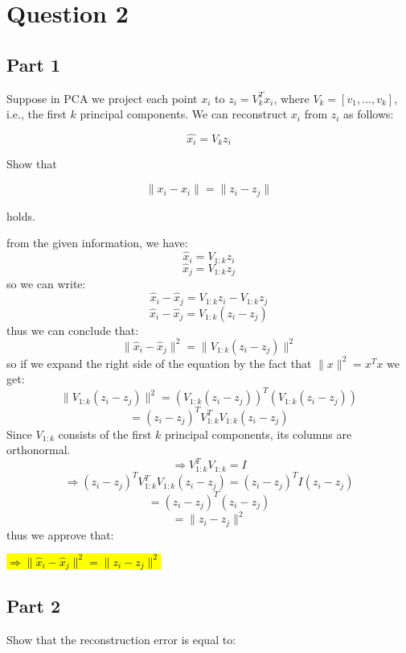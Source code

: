 \section{Question 2}
\subsection{Part 1}
Suppose in PCA we project each point \( x_i \) to \( z_i = V_k^T x_i \), where \( V_k = [v_1, \dots, v_k] \), i.e., the first \( k \) principal components. We can reconstruct \( x_i \) from \( z_i \) as follows:

\[
\hat{x_i} = V_k z_i
\]

Show that

\[
\| x_i - \hat{x_i} \| = \| z_i - z_j \|
\]

holds.
\begin{qsolve}
    \begin{qsolve}[]
        from the given information, we have:
        \[
        \hat{x}_i = V_{1:k} z_i
        \]
        \[
        \hat{x}_j = V_{1:k} z_j
        \]
        so we can write:
        \[
        \hat{x}_i - \hat{x}_j = V_{1:k} z_i - V_{1:k} z_j
        \]
        \[
        \hat{x}_i - \hat{x}_j = V_{1:k} (z_i - z_j)
        \]
        thus we can conclude that:
        \[
        \| \hat{x}_i - \hat{x}_j \|^2 = \| V_{1:k} (z_i - z_j) \|^2
        \]
        so if we expand the right side of the equation by the fact that $\| x \|^2 = x^T x$ we get:
        \[
        \| V_{1:k} (z_i - z_j) \|^2 = (V_{1:k} (z_i - z_j))^T (V_{1:k} (z_i - z_j))
        \]
        \[
        = (z_i - z_j)^T V_{1:k}^T V_{1:k} (z_i - z_j)
        \]
        Since $V_{1:k}$ consists of the first $k$ principal components, its columns are orthonormal.
        \[
        \Rightarrow V_{1:k}^T V_{1:k} = I
        \]
        \[
        \Rightarrow (z_i - z_j)^T V_{1:k}^T V_{1:k} (z_i - z_j) = (z_i - z_j)^T I (z_i - z_j)
        \]
        \[
        = (z_i - z_j)^T (z_i - z_j)
        \]
        \[
        = \| z_i - z_j \|^2
        \]
        thus we approve that:
        \begin{center}
            \hl{$\Rightarrow \| \hat{x}_i - \hat{x}_j \|^2 = \| z_i - z_j \|^2$}
        \end{center}
        
    \end{qsolve}
\end{qsolve}
\subsection{Part 2}
Show that the reconstruction error is equal to:

